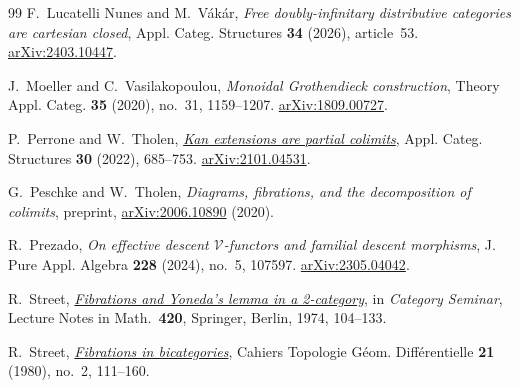 \documentclass[11pt,a4paper]{amsart}
\theoremstyle{definition}
\numberwithin{equation}{section}
\begin{document}
\begin{thebibliography}{99}
 F.~Lucatelli Nunes and M.~V\'ak\'ar,
\emph{Free doubly-infinitary distributive categories are cartesian closed},
Appl. Categ. Structures \textbf{34} (2026), article~53. \href{https://arxiv.org/abs/2403.10447}{arXiv:2403.10447}.

 J.~Moeller and C.~Vasilakopoulou,
\emph{Monoidal Grothendieck construction},
Theory Appl. Categ. \textbf{35} (2020), no.~31, 1159--1207.
\href{https://arxiv.org/abs/1809.00727}{arXiv:1809.00727}.

 P.~Perrone and W.~Tholen,
\href{https://doi.org/10.1007/s10485-021-09671-9}{\emph{Kan extensions are partial colimits}},
Appl. Categ. Structures \textbf{30} (2022), 685--753.
\href{https://arxiv.org/abs/2101.04531}{arXiv:2101.04531}.

 G.~Peschke and W.~Tholen,
\emph{Diagrams, fibrations, and the decomposition of colimits},
preprint, \href{https://arxiv.org/abs/2006.10890}{arXiv:2006.10890} (2020).

 R.~Prezado,
\emph{On effective descent $\mathcal V$-functors and familial descent morphisms},
J. Pure Appl. Algebra \textbf{228} (2024), no.~5, 107597. \href{https://arxiv.org/abs/2305.04042}{arXiv:2305.04042}.

 R.~Street,
\href{https://doi.org/10.1007/BFb0063102}{\emph{Fibrations and Yoneda's lemma in a 2-category}},
in \emph{Category Seminar}, Lecture Notes in Math.~\textbf{420},
Springer, Berlin, 1974, 104--133.

 R.~Street,
\href{https://www.numdam.org/item/CTGDC_1980__21_2_111_0/}{\emph{Fibrations in bicategories}},
Cahiers Topologie G\'eom. Diff\'erentielle \textbf{21} (1980), no.~2, 111--160.

\end{thebibliography}
\end{document}
